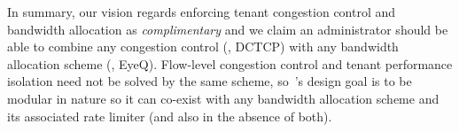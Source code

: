 In summary, our vision regards enforcing tenant congestion control and bandwidth allocation as {\em complimentary} and we claim 
an administrator should be able to
combine any congestion control (\eg{}, DCTCP) with any bandwidth allocation scheme (\eg{}, EyeQ). 
Flow-level congestion control and tenant performance isolation need not be solved by the same scheme,
so~\acdc{}'s design goal is to be modular in nature so it can co-exist with any bandwidth allocation scheme
and its associated rate limiter (and also in the absence of both). 

%
